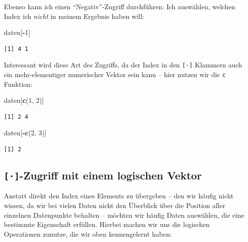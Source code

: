 \documentclass[12pt,]{tufte-book}
\newenvironment{Shaded}{\begin{snugshade}}{\end{snugshade}}
\newcommand{\KeywordTok}[1]{\textcolor[rgb]{0.13,0.29,0.53}{\textbf{#1}}}
\newcommand{\DecValTok}[1]{\textcolor[rgb]{0.00,0.00,0.81}{#1}}
\newcommand{\OperatorTok}[1]{\textcolor[rgb]{0.81,0.36,0.00}{\textbf{#1}}}
\newcommand{\NormalTok}[1]{#1}
\theoremstyle{definition}
\theoremstyle{definition}
\theoremstyle{definition}
\theoremstyle{remark}
\begin{document}
Ebenso kann ich einen ``Negativ''-Zugriff durchführen: Ich auswählen,
welchen Index ich \emph{nicht} in meinem Ergebnis haben will:

\begin{Shaded}
\begin{Highlighting}[]
\NormalTok{daten[}\OperatorTok{-}\DecValTok{1}\NormalTok{]}
\end{Highlighting}
\end{Shaded}

\begin{verbatim}
[1] 4 1
\end{verbatim}

Interessant wird diese Art des Zugriffs, da der Index in den
\texttt{{[}·{]}} Klammern auch ein mehr-elementiger numerischer Vektor
sein kann -- hier nutzen wir die \texttt{c} Funktion:

\begin{Shaded}
\begin{Highlighting}[]
\NormalTok{daten[}\KeywordTok{c}\NormalTok{(}\DecValTok{1}\NormalTok{, }\DecValTok{2}\NormalTok{)]}
\end{Highlighting}
\end{Shaded}

\begin{verbatim}
[1] 2 4
\end{verbatim}

\begin{Shaded}
\begin{Highlighting}[]
\NormalTok{daten[}\OperatorTok{-}\KeywordTok{c}\NormalTok{(}\DecValTok{2}\NormalTok{, }\DecValTok{3}\NormalTok{)]}
\end{Highlighting}
\end{Shaded}

\begin{verbatim}
[1] 2
\end{verbatim}

\hypertarget{logischerZugriff}{\subsection{\texorpdfstring{\texttt{{[}·{]}}-Zugriff
mit einem logischen
Vektor}{{[}·{]}-Zugriff mit einem logischen Vektor}}\label{logischerZugriff}}

Anstatt direkt den Index eines Elements zu übergeben -- den wir häufig
nicht wissen, da wir bei vielen Daten nicht den Überblick über die
Position aller einzelnen Datenpunkte behalten -- möchten wir häufig
Daten auswählen, die eine bestimmte Eigenschaft erfüllen. Hierbei machen
wir uns die logischen Operationen zunutze, die wir oben kennengelernt
haben:
\end{document}
